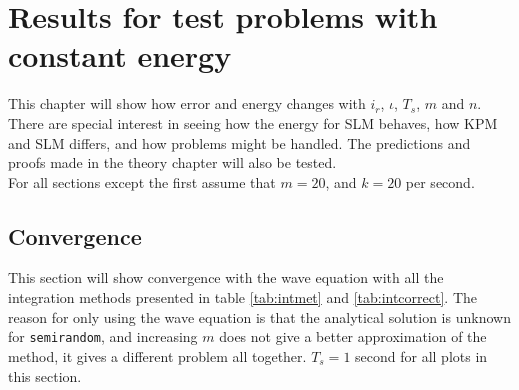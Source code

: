 \chapter{Results for test problems with constant energy}%
\label{sec:constres}
This chapter will show how error and energy changes with $i_r$, $\iota$, $T_s$, $m$ and $n$. There are special interest in seeing how the energy for SLM behaves, how KPM and SLM differs, and how problems might be handled. The predictions and proofs made in the theory chapter will also be tested. \\

For all sections except the first assume that $m=20$, and $k = 20$ per second. 
\section{Convergence}%
This section will show convergence with the wave equation with all the integration methods presented in table \ref{tab:intmet} and \ref{tab:intcorrect}. The reason for only using the wave equation is that the analytical solution is unknown for \texttt{semirandom}, and increasing $m$ does not give a better approximation of the method, it gives a different problem all together. $T_s = 1$ second for all plots in this section.
